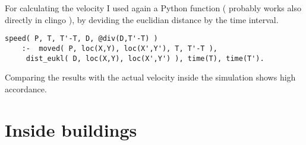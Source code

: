 \documentclass[11pt,a4paper]{article}
\begin{document}
For calculating the velocity I used again a Python function ( probably works also directly in clingo ), by deviding the euclidian distance by the time interval.
\begin{lstlisting}[numbers=none]
speed( P, T, T'-T, D, @div(D,T'-T) ) 
	:-  moved( P, loc(X,Y), loc(X',Y'), T, T'-T ),
	 dist_eukl( D, loc(X,Y), loc(X',Y') ), time(T), time(T').
\end{lstlisting}	 
Comparing the results with the actual velocity inside the simulation shows high accordance.





\section{Inside buildings}
\lstlistoflistings




       
\end{document}
